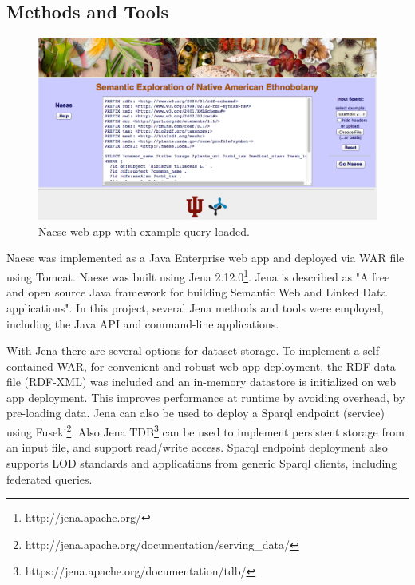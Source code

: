 \documentclass{acm_proc_article-sp}
\begin{document}
\subsection{Methods and Tools}

\begin{figure}[t]
\centering
\includegraphics[width=0.8\linewidth]{Naese_demo_04}
\caption[Naese web app]{Naese web app with example query loaded.}
\label{fig:Naese_demo_04}
\end{figure}
 
Naese was implemented as a Java Enterprise web app and deployed via WAR file using Tomcat. Naese was built using Jena 2.12.0\footnote{http://jena.apache.org/}. Jena is described as "A free and open source Java framework for building Semantic Web and Linked Data applications". In this project, several Jena methods and tools were employed, including the Java API and command-line applications.

With Jena there are several options for dataset storage. To implement a self-contained WAR, for convenient and robust web app deployment, the RDF data file (RDF-XML) was included and an in-memory datastore is initialized on web app deployment. This improves performance at runtime by avoiding overhead, by pre-loading data.  Jena can also be used to deploy a Sparql endpoint (service) using Fuseki\footnote{http://jena.apache.org/documentation/serving\_data/}.  Also Jena TDB\footnote{https://jena.apache.org/documentation/tdb/} can be used to implement persistent storage from an input file, and support read/write access. Sparql endpoint deployment also supports LOD standards and applications from generic Sparql clients, including federated queries.
\end{document}
